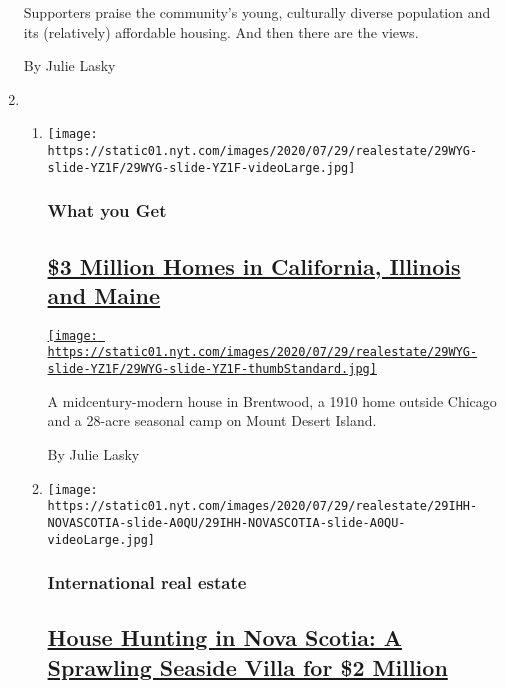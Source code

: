 \begin{enumerate}
  Supporters praise the community's young, culturally diverse population
  and its (relatively) affordable housing. And then there are the views.

  By Julie Lasky
\item
  \begin{enumerate}
  \def\labelenumii{\arabic{enumii}.}
  \item
    \texttt{[image: https://static01.nyt.com/images/2020/07/29/realestate/29WYG-slide-YZ1F/29WYG-slide-YZ1F-videoLarge.jpg]}

    \hypertarget{what-you-get}{%
    \subsubsection{What you Get}\label{what-you-get}}

    \hypertarget{3-million-homes-in-california-illinois-and-maine}{%
    \subsection{\texorpdfstring{\href{/2020/07/29/realestate/3-million-homes-in-california-illinois-and-maine.html}{\$3
    Million Homes in California, Illinois and
    Maine}}{\$3 Million Homes in California, Illinois and Maine}}\label{3-million-homes-in-california-illinois-and-maine}}

    \href{/2020/07/29/realestate/3-million-homes-in-california-illinois-and-maine.html}{\texttt{[image: https://static01.nyt.com/images/2020/07/29/realestate/29WYG-slide-YZ1F/29WYG-slide-YZ1F-thumbStandard.jpg]}}

    A midcentury-modern house in Brentwood, a 1910 home outside Chicago
    and a 28-acre seasonal camp on Mount Desert Island.

    By Julie Lasky
  \item
    \texttt{[image: https://static01.nyt.com/images/2020/07/29/realestate/29IHH-NOVASCOTIA-slide-A0QU/29IHH-NOVASCOTIA-slide-A0QU-videoLarge.jpg]}

    \hypertarget{international-real-estate}{%
    \subsubsection{International real
    estate}\label{international-real-estate}}

    \hypertarget{house-hunting-in-nova-scotia-a-sprawling-seaside-villa-for-2-million}{%
    \subsection{\texorpdfstring{\href{/2020/07/29/realestate/house-hunting-in-nova-scotia-a-sprawling-seaside-villa-for-2-million.html}{House
    Hunting in Nova Scotia: A Sprawling Seaside Villa for \$2
    Million}}{House Hunting in Nova Scotia: A Sprawling Seaside Villa for \$2 Million}}\label{house-hunting-in-nova-scotia-a-sprawling-seaside-villa-for-2-million}}


\end{enumerate}
\end{enumerate}
